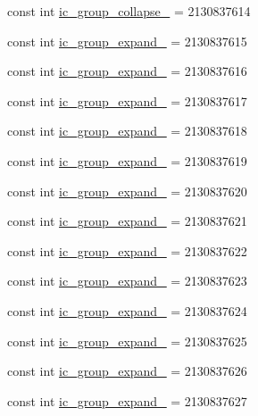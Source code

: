 \begin{CompactItemize}
\item 
const int \hyperlink{class__2doo_1_1_droid_1_1_resource_1_1_drawable_c968bfcf3261aa393b0bd1c4ad8a9ccc}{ic\_\-group\_\-collapse\_} = 2130837614
\item 
const int \hyperlink{class__2doo_1_1_droid_1_1_resource_1_1_drawable_ec774712ed2240f3f8b33ded84c2cdd2}{ic\_\-group\_\-expand\_} = 2130837615
\item 
const int \hyperlink{class__2doo_1_1_droid_1_1_resource_1_1_drawable_2f90bca1cea45dff6f39667237d8e293}{ic\_\-group\_\-expand\_} = 2130837616
\item 
const int \hyperlink{class__2doo_1_1_droid_1_1_resource_1_1_drawable_c932843ba1a6cc7d8bc4bd90135c226c}{ic\_\-group\_\-expand\_} = 2130837617
\item 
const int \hyperlink{class__2doo_1_1_droid_1_1_resource_1_1_drawable_9209cdac2702f44a7e2e9556fadfff48}{ic\_\-group\_\-expand\_} = 2130837618
\item 
const int \hyperlink{class__2doo_1_1_droid_1_1_resource_1_1_drawable_06c2c759738ab4e819305fd66b2b8e48}{ic\_\-group\_\-expand\_} = 2130837619
\item 
const int \hyperlink{class__2doo_1_1_droid_1_1_resource_1_1_drawable_ef7741c26a69ac38c33b95d38920068e}{ic\_\-group\_\-expand\_} = 2130837620
\item 
const int \hyperlink{class__2doo_1_1_droid_1_1_resource_1_1_drawable_22f9271f8f8af73d1778abfbf16d2596}{ic\_\-group\_\-expand\_} = 2130837621
\item 
const int \hyperlink{class__2doo_1_1_droid_1_1_resource_1_1_drawable_464cee28d4bf7edb04b7564894227078}{ic\_\-group\_\-expand\_} = 2130837622
\item 
const int \hyperlink{class__2doo_1_1_droid_1_1_resource_1_1_drawable_4fd786854e80c48b71c06eb9a4e1a52d}{ic\_\-group\_\-expand\_} = 2130837623
\item 
const int \hyperlink{class__2doo_1_1_droid_1_1_resource_1_1_drawable_6f66d0963ac39161e6d8348e10b37883}{ic\_\-group\_\-expand\_} = 2130837624
\item 
const int \hyperlink{class__2doo_1_1_droid_1_1_resource_1_1_drawable_98a6c2beb5ddd707b7c2045abb5f9397}{ic\_\-group\_\-expand\_} = 2130837625
\item 
const int \hyperlink{class__2doo_1_1_droid_1_1_resource_1_1_drawable_ebab01946857ebc3fd3bbaf9c3e0f168}{ic\_\-group\_\-expand\_} = 2130837626
\item 
const int \hyperlink{class__2doo_1_1_droid_1_1_resource_1_1_drawable_41486611a94bf1d7bdff1b39bce1a0d2}{ic\_\-group\_\-expand\_} = 2130837627

\end{CompactItemize}
